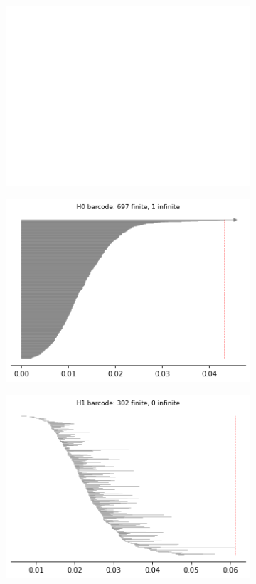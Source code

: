 \begin{figure}[H]
\begin{subfigure}[b]{0.25\textwidth}
\includegraphics[width=\textwidth]{figures/topology/white.png} 
\end{subfigure}
\begin{subfigure}[b]{0.24\textwidth}
    \includegraphics[width=\textwidth]{figures/topology/X1_H0_barcode.png}
    \caption{}
\end{subfigure}
\begin{subfigure}[b]{0.24\textwidth}
    \includegraphics[width=\textwidth]{figures/topology/X1_H1_barcode.png}

\end{subfigure}
\end{figure}
